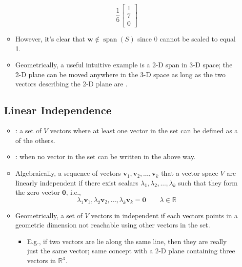 \begin{itemize}
\begin{itemize}
\[    \frac{1}{6}\begin{bmatrix} 1 \\ 7 \\ 0 \end{bmatrix} 
    \]%
    \item However, it's clear that \(\bm{w}\notin \operatorname{span}(S) \) since 0 cannot be scaled to equal 1.
    \item Geometrically, a useful intuitive example is a 2-D span in 3-D space; the 2-D plane can be moved anywhere in the 3-D space as long as the two vectors describing the 2-D plane are \hyperref[Linear Independence]{}.
  \end{itemize}
  
  \subsection{Linear Independence}\label{Linear Independence}
  \begin{itemize}
    \item {}: a set of \(V\) vectors where at least one vector in the set can be defined as a \hyperref[Linear combination]{} of the others.
    \item {}: when no vector in the set can be written in the above way. 
    \item Algebraically, a sequence of vectors \(\bm{v}_1,\bm{v}_2,\dots,\bm{v}_k\) that a vector space \(V\) are linearly independent if there exist scalars \(\lambda_1,\lambda_2,\dots,\lambda_k\) such that they form the zero vector \(\bm{0}\), i.e.,
    \[%
    \lambda_1\bm{v}_1,\lambda_2\bm{v}_2,\dots,\lambda_k\bm{v}_k = \bm{0} \qquad \lambda \in \mathbb{R}
    \]%
    \item Geometrically, a set of \(V\) vectors in independent if each vectors points in a geometric dimension not reachable using other vectors in the set.
    \begin{itemize}
      \item E.g., if two vectors are lie along the same line, then they are really just the same vector; same concept with a 2-D plane containing three vectors in \(\mathbb{R}^3\).
    \end{itemize}
    \end{itemize}
  

\end{itemize}
